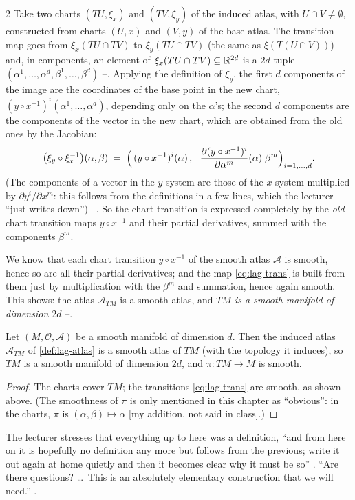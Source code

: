 \begin{paracol}{2}
Take two charts $(TU,\xi_x)$ and $(TV,\xi_y)$ of the induced atlas, with $U\cap V\neq\emptyset$, constructed from charts $(U,x)$ and $(V,y)$ of the base atlas. The transition map goes from $\xi_x(TU\cap TV)$ to $\xi_y(TU\cap TV)$ (the same as $\xi(T(U\cap V))$) and, in components, an element of $\xi_x(TU\cap TV)\subseteq\mathbb{R}^{2d}$ is a $2d$-tuple $(\alpha^1,\dots,\alpha^d,\beta^1,\dots,\beta^d)$ --. Applying the definition of $\xi_y$, the first $d$ components of the image are the coordinates of the base point in the new chart, $(y\circ x^{-1})^i(\alpha^1,\dots,\alpha^d)$, depending only on the $\alpha$'s; the second $d$ components are the components of the vector in the new chart, which are obtained from the old ones by the Jacobian:
\begin{equation}\label{eq:lag-trans}
  \bigl(\xi_y\circ\xi_x^{-1}\bigr)(\alpha,\beta)\;=\;\Bigl(\,(y\circ x^{-1})^i(\alpha)\,,\ \ \frac{\partial(y\circ x^{-1})^i}{\partial\alpha^m}(\alpha)\;\beta^m\Bigr)_{i=1,\dots,d} .
\end{equation}
(The components of a vector in the $y$-system are those of the $x$-system multiplied by $\partial y^i/\partial x^m$: this follows from the definitions in a few lines, which the lecturer ``just writes down'') --. So the chart transition is expressed completely by the \emph{old} chart transition maps $y\circ x^{-1}$ and their partial derivatives, summed with the components $\beta^m$.

We know that each chart transition $y\circ x^{-1}$ of the smooth atlas $\mathcal A$ is smooth, hence so are all their partial derivatives; and the map \eqref{eq:lag-trans} is built from them just by multiplication with the $\beta^m$ and summation, hence again smooth. This shows: the atlas $\mathcal A_{TM}$ is a smooth atlas, and \emph{$TM$ is a smooth manifold of dimension $2d$} --.

\begin{theorem}\label{thm:lag-smooth}
Let $(M,\mathcal O,\mathcal A)$ be a smooth manifold of dimension $d$. Then the induced atlas $\mathcal A_{TM}$ of \cref{def:lag-atlas} is a smooth atlas of $TM$ (with the topology it induces), so $TM$ is a smooth manifold of dimension $2d$, and $\pi\colon TM\to M$ is smooth.
\end{theorem}
\begin{proof}
The charts cover $TM$; the transitions \eqref{eq:lag-trans} are smooth, as shown above. (The smoothness of $\pi$ is only mentioned in this chapter as ``obvious'': in the charts, $\pi$ is $(\alpha,\beta)\mapsto\alpha$ [my addition, not said in class].)
\end{proof}
The lecturer stresses that everything up to here was a definition, ``and from here on it is hopefully no definition any more but follows from the previous; write it out again at home quietly and then it becomes clear why it must be so'' . ``Are there questions? \dots\ This is an absolutely elementary construction that we will need.'' .


\end{paracol}
